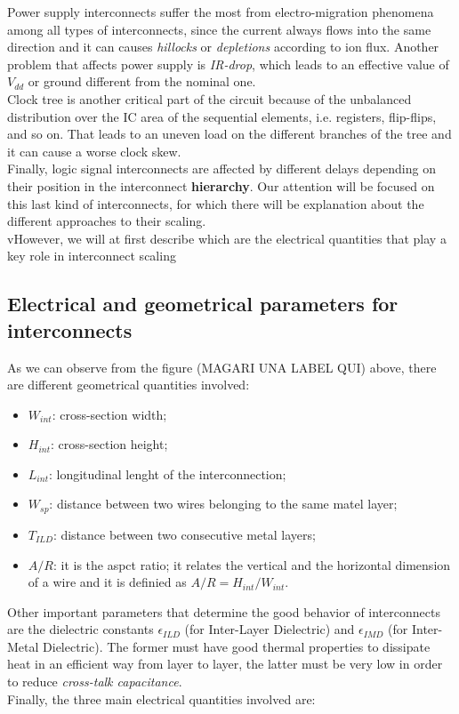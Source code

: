 \documentclass[a4paper, 12pt, twoside, openright]{report}
\begin{document}
Power supply interconnects suffer the most from electro-migration phenomena among all types of interconnects, since the current always flows into the same direction and it can causes \textit{hillocks} or \textit{depletions} according to ion flux. Another problem that affects power supply is \textit{IR-drop}, which leads to an effective value of $V_{dd}$ or ground different from the nominal one.\\ Clock tree is another critical part of the circuit because of the unbalanced distribution over the IC area of the sequential elements, i.e. registers, flip-flips, and so on. That leads to an uneven load on the different branches of the tree and it can cause a worse clock skew. \\ Finally, logic signal interconnects are affected by different delays depending on their position in the interconnect \textbf{hierarchy}. Our attention will be focused on this last kind of interconnects, for which there will be explanation about the different approaches to their scaling. \\vHowever, we will at first describe which are the electrical quantities that play a key role in interconnect scaling

\subsection{Electrical and geometrical parameters for interconnects}
As we can observe from the figure (MAGARI UNA LABEL QUI) above, there are different geometrical quantities involved: 

\begin{itemize}
\item $W_{int}$: cross-section width;
\item $H_{int}$: cross-section height;
\item $L_{int}$: longitudinal lenght of the interconnection;
\item $W_{sp}$: distance between two wires belonging to the same matel layer;
\item $T_{ILD}$: distance between two consecutive metal layers;
\item $A/R$: it is the aspct ratio; it relates the vertical and the horizontal dimension of a wire and it is definied as $A/R=H_{int}/W_{int}$.
\end{itemize}

Other important parameters that determine the good behavior of interconnects are the dielectric constants $\epsilon_{ILD}$ (for Inter-Layer Dielectric) and $\epsilon_{IMD}$ (for Inter-Metal Dielectric). The former must have good thermal properties to dissipate heat in an efficient way from layer to layer, the latter must be very low in order to reduce \textit{cross-talk capacitance}.\\ Finally, the three main electrical quantities involved are:
\end{document}
